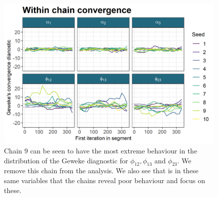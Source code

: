 \documentclass[]{article}
\begin{document}
\begin{figure}
	\centering
	\includegraphics[scale=1.0]{../Images/Yeast/Convergence/gewekePlot.png}
	\caption{Chain 9 can be seen to have the most extreme behaviour in the distribution of the Geweke diagnostic for $\phi_{12}, \phi_{13}$ and $\phi_{23}$. We remove this chain from the analysis. We also see that is in these same variables that the chains reveal poor behaviour and focus on these.}
	\label{fig:gewekePlot}
\end{figure}
\end{document}
